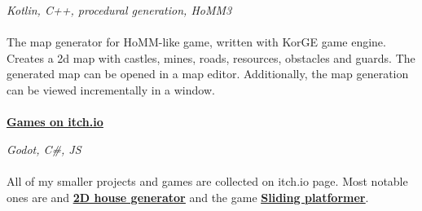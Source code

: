 \documentclass{article}
\begin{document}
\noindent\textit{Kotlin, C++, procedural generation, HoMM3}
 \\\\
\noindent The map generator for HoMM-like game, written with KorGE game engine. Creates a 2d map with castles, mines, roads, resources, obstacles and guards. The generated map can be opened in a map editor. Additionally, the map generation can be viewed incrementally in a window.
\\\\
\noindent\href{https://llesha.itch.io/}{{\textbf{\underline{Games on itch.io}}}}

\noindent\textit{Godot, C\#, JS}
\\\\
\noindent All of my smaller projects and games are collected on itch.io page. Most notable ones are
and \href{https://llesha.itch.io/2d-house-generator}{{\textbf{\underline{2D house generator}}}} and the game \href{https://llesha.itch.io/sliding-platformer}{{\textbf{\underline{Sliding platformer}}}}.
\end{document}
